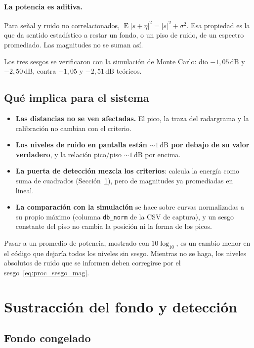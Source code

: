 \paragraph{La potencia es aditiva.}
Para señal y ruido no correlacionados,
$\operatorname{E}\lvert s + \eta\rvert^2 = \lvert s\rvert^2 + \sigma^2$.
Esa propiedad es la que da sentido estadístico a restar un fondo, o un piso
de ruido, de un espectro promediado. Las magnitudes no se suman así.

Los tres sesgos se verificaron con la simulación de Monte Carlo: dio
$-1{,}05\,\text{dB}$ y $-2{,}50\,\text{dB}$, contra $-1{,}05$ y
$-2{,}51\,\text{dB}$ teóricos.

\subsection{Qué implica para el sistema}

\begin{itemize}
  \item \textbf{Las distancias no se ven afectadas.} El pico, la traza del
    radargrama y la calibración no cambian con el criterio.
  \item \textbf{Los niveles de ruido en pantalla están $\sim 1\,\text{dB}$
    por debajo de su valor verdadero}, y la relación pico/piso $\sim
    1\,\text{dB}$ por encima.
  \item \textbf{La puerta de detección mezcla los criterios}: calcula la
    energía como suma de cuadrados (Sección~\ref{sec:proc_fondo}), pero de
    magnitudes ya promediadas en lineal.
  \item \textbf{La comparación con la simulación} se hace sobre curvas
    normalizadas a su propio máximo (columna \texttt{db\_norm} de la CSV
    de captura), y un sesgo constante del piso no cambia la posición ni la
    forma de los picos.
\end{itemize}
Pasar a un promedio de potencia, mostrado con $10\log_{10}$, es un cambio
menor en el código que dejaría todos los niveles sin sesgo. Mientras no se
haga, los niveles absolutos de ruido que se informen deben corregirse por el
sesgo~\eqref{eq:proc_sesgo_mag}.

\section{Sustracción del fondo y detección}
\label{sec:proc_fondo}

\subsection{Fondo congelado}

